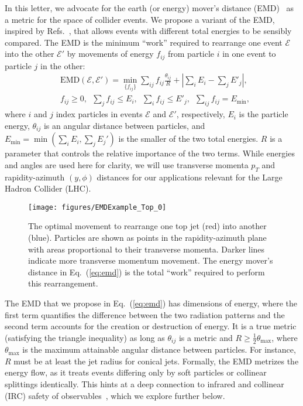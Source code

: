 \documentclass[aps,prl,twocolumn,preprintnumbers,nofootinbib,longbibliography,floatfix]{revtex4-1}
\DeclareRobustCommand{\Eq}[1]{Eq.~(\ref{#1})}
\DeclareRobustCommand{\Refs}[1]{Refs.~\cite{#1}}
\begin{document}
In this letter, we advocate for the earth (or energy) mover's distance (EMD)~\cite{DBLP:journals/pami/PelegWR89,Rubner:1998:MDA:938978.939133,Rubner:2000:EMD:365875.365881,DBLP:conf/eccv/PeleW08,DBLP:conf/gsi/PeleT13} as a metric for the space of collider events.
%
We propose a variant of the EMD, inspired by \Refs{DBLP:conf/eccv/PeleW08,DBLP:conf/gsi/PeleT13}, that allows events with different total energies to be sensibly compared.
%
The EMD is the minimum ``work'' required to rearrange one event $\mathcal E$ into the other $\mathcal E'$ by movements of energy $f_{ij}$ from particle $i$ in one event to particle $j$ in the other:
\vspace{-0.5em}
\begin{align}\label{eq:emd}
&\text{EMD}(\mathcal E, \mathcal E') = \min_{\{f_{ij}\}}\sum_{ij} f_{ij} \frac{\theta_{ij}}{R} + \left|\sum_i E_i - \sum_j E'_j\right|,\\
&f_{ij} \ge 0,\,\,\, \sum_{j} f_{ij} \le E_i,\,\,\, \sum_i f_{ij} \le E'_j,\,\,\,\sum_{ij}f_{ij}= E_\text{min},\nonumber
\end{align}
where $i$ and $j$ index particles in events $\mathcal E$ and $\mathcal E'$, respectively, $E_i$ is the particle energy, $\theta_{ij}$ is an angular distance between particles, and $E_\text{min}=\min(\sum_i E_i, \sum_j E_j')$ is the smaller of the two total energies.
%
$R$ is a parameter that controls the relative importance of the two terms.
%
While energies and angles are used here for clarity, we will use transverse momenta $p_{T}$ and rapidity-azimuth $(y,\phi)$ distances for our applications relevant for the Large Hadron Collider (LHC).


\begin{figure}[t]
\centering
\texttt{[image: figures/EMDExample\_Top\_0]}
\caption{The optimal movement to rearrange one top jet (red) into another (blue).
%
Particles are shown as points in the rapidity-azimuth plane with areas proportional to their transverse momenta.
%
Darker lines indicate more transverse momentum movement.
%
The energy mover's distance in \Eq{eq:emd} is the total ``work'' required to perform this rearrangement.}
\label{fig:exemd}
\end{figure}


The EMD that we propose in \Eq{eq:emd} has dimensions of energy, where the first term quantifies the difference between the two radiation patterns and the second term accounts for the creation or destruction of energy.
%
It is a true metric (satisfying the triangle inequality) as long as $\theta_{ij}$ is a metric and $R \ge \frac12 \theta_\text{max}$, where $\theta_\text{max}$ is the maximum attainable angular distance between particles.
%
For instance, $R$ must be at least the jet radius for conical jets.
%
Formally, the EMD metrizes the energy flow, as it treats events differing only by soft particles or collinear splittings identically.
%
This hints at a deep connection to infrared and collinear (IRC) safety of observables~\cite{Kinoshita:1962ur,Lee:1964is,Brock:1993sz,Weinberg:1995mt}, which we explore further below.
\end{document}
